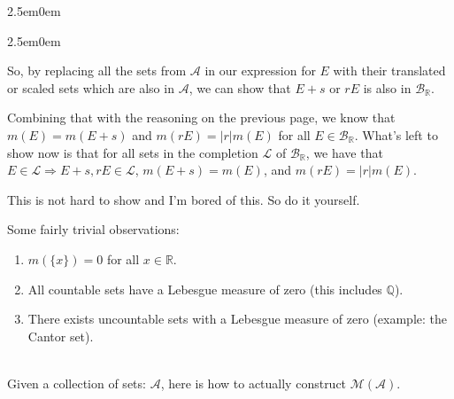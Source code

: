 \documentclass{book}
\newcommand{\myComment}{%
   \color{RawerSienna}%
   \fontsize{12}{14}\selectfont%
}
\newcommand{\teachComment}{
   \color{Orange}%
   \fontsize{12}{14}\selectfont%
}
\newenvironment{myIndent}{%
   \begin{adjustwidth}{2.5em}{0em}%
}{%
   \end{adjustwidth}%
}
\newcommand{\mySepTwo}[1][.]{%
   {\noindent\color{#1}{\rule{6.5in}{0.5mm}}}\\%
}
\newcommand{\retTwo}{\hfill\bigbreak}
\begin{document}
\begin{myIndent}
\begin{myIndent}
      So, by replacing all the sets from $\mathcal{A}$ in our expression for $E$ with their translated or scaled sets which are also in $\mathcal{A}$, we can show that $E + s$ or $rE$ is also in $\mathcal{B}_\mathbb{R}$.\retTwo

      Combining that with the reasoning on the previous page, we know that\\ $m(E) = m(E + s)$ and $m(rE) = |r|m(E)$ for all $E \in \mathcal{B}_\mathbb{R}$. What's left to show now is that for all sets in the completion $\mathcal{L}$ of $\mathcal{B}_{\mathbb{R}}$, we have that $E \in \mathcal{L} \Longrightarrow E + s, rE \in \mathcal{L}$, $m(E + s) = m(E)$, and $m(rE) = |r|m(E)$.\retTwo

      \myComment This is not hard to show and I'm bored of this. So do it yourself.\retTwo
   \end{myIndent}
\end{myIndent}

{\teachComment
Some fairly trivial observations:
\begin{enumerate}
   \item $m(\{x\}) = 0$ for all $x \in \mathbb{R}$.
   \item All countable sets have a Lebesgue measure of zero (this includes $\mathbb{Q}$).
   \item There exists uncountable sets with a Lebesgue measure of zero (example: the Cantor set).
\end{enumerate}}

\mySepTwo

Given a collection of sets: $\mathcal{A}$, here is how to actually construct $\mathcal{M}(\mathcal{A})$.\retTwo
\end{document}
